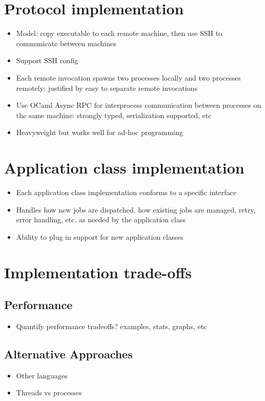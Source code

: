 \documentclass[twoside]{report}
\begin{document}
\section{Protocol implementation}

\begin{itemize}
  \item Model: copy executable to each remote machine, then use SSH to communicate between machines
  \item Support SSH config
  \item Each remote invocation spawns two processes locally and two processes remotely: justified by easy to separate remote invocations
  \item Use OCaml Async RPC for interprocess communication between processes on the same machine: strongly typed, serialization supported, etc
  \item Heavyweight but works well for ad-hoc programming
\end{itemize}

\section{Application class implementation}

\begin{itemize}
  \item Each application class implementation conforms to a specific interface
  \item Handles how new jobs are dispatched, how existing jobs are managed, retry, error handling, etc. as needed by the application class
  \item Ability to plug in support for new application classes
\end{itemize}

\section{Implementation trade-offs}

\subsection{Performance}
\begin{itemize}
  \item Quantify performance tradeoffs? examples, stats, graphs, etc
\end{itemize}

\subsection{Alternative Approaches}
\begin{itemize}
  \item Other languages
  \item Threads vs processes
\end{itemize}
\end{document}
